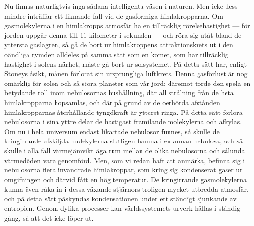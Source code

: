 \documentclass[a4paper, 12pt, oneside, swedish]{article}
\begin{document}
Nu finnas naturligtvis inga sådana intelligenta väsen i naturen. Men icke dess mindre inträffar ett liknande fall vid de gasformiga himlakropparna. Om gasmolekylerna i en himlakropps atmosfär ha en tillräcklig rörelsehastighet --- för jorden uppgår denna till 11 kilometer i sekunden --- och röra sig utåt bland de yttersta gaslagren, så gå de bort ur himlakroppens attraktionskrets ut i den oändliga rymden alldeles på samma sätt som en komet, som har tillräcklig hastighet i solens närhet, måste gå bort ur solsystemet. På detta sätt har, enligt Stoneys åsikt, månen förlorat sin ursprungliga luftkrets. Denna gasförlust är nog omärklig för solen och så stora planeter som vår jord; däremot torde den spela en betydande roll inom nebulosornas hushållning, där all strålning från de heta himlakropparna hopsamlas, och där på grund av de oerhörda afstånden himlakropparnas återhållande tyngdkraft är ytterst ringa. På detta sätt förlora nebulosorna i sina yttre delar de hastigast framilande molekylerna och afkylas. Om nu i hela universum endast likartade nebulosor funnes, så skulle de kringirrande afskiljda molekylerna slutligen hamna i en annan nebulosa, och så skulle i alla fall värmejämvikt äga rum mellan de olika nebulosorna och sålunda värmedöden vara genomförd. Men, som vi redan haft att anmärka, befinna sig i nebulosorna flera invandrade himlakroppar, som kring sig kondenserat gaser ur omgifningen och därvid fått en hög temperatur. De kringirrande gasmolekylerna kunna även råka in i dessa växande stjärnors troligen mycket utbredda atmosfär, och på detta sätt påskyndas kondensationen under ett ständigt sjunkande av entropien. Genom dylika processer kan världssystemets urverk hållas i ständig gång, så att det icke löper ut.
\end{document}
